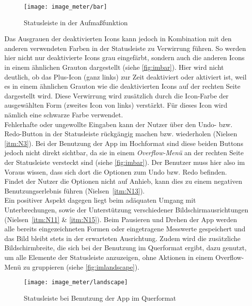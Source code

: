 \begin{wrapfigure}{R}{0.5\textwidth}
  \centering
  \texttt{[image: image\_meter/bar]}
  \caption{Statusleiste in der Aufmaßfunktion}
  \label{fig:imbar}
\end{wrapfigure}

Das Ausgrauen der deaktivierten Icons kann jedoch in Kombination mit den anderen verwendeten Farben in der Statusleiste zu Verwirrung führen.
So werden hier nicht nur deaktivierte Icons grau eingefärbt, sondern auch die anderen Icons in einem ähnlichen Grauton dargestellt (siehe \autoref{fig:imbar}).
Hier wird nicht deutlich, ob das Plus-Icon (ganz links) zur Zeit deaktiviert oder aktiviert ist, weil es in einem ähnlichen Grauton wie die deaktivierten Icons auf der rechten Seite dargestellt wird.
Diese Verwirrung wird zusätzlich durch die Icon-Farbe der ausgewählten Form (zweites Icon von links) verstärkt.
Für dieses Icon wird nämlich eine schwarze Farbe verwendet. \\

Fehlerhafte oder ungewollte Eingaben kann der Nutzer über den Undo- bzw. Redo-Button in der Statusleiste rückgängig machen bzw. wiederholen (Nielsen \autoref{itm:N3}).
Bei der Benutzung der App im Hochformat sind diese beiden Buttons jedoch nicht direkt sichtbar, da sie in einem \emph{Overflow-Menü} an der rechten Seite der Statusleiste versteckt sind (siehe \autoref{fig:imbar}).
Der Benutzer muss hier also im Voraus wissen, dass sich dort die Optionen zum Undo bzw. Redo befinden.
Findet der Nutzer die Optionen nicht auf Anhieb, kann dies zu einem negativen Benutzungserlebnis führen (Nielsen~\autoref{itm:N13}). \\

Ein positiver Aspekt dagegen liegt beim adäquaten Umgang mit Unterbrechungen, sowie der Unterstützung verschiedener Bildschirmausrichtungen (Nielsen~\autoref{itm:N11} \& \autoref{itm:N15}).
Beim Pausieren und Drehen der App werden alle bereits eingezeichneten Formen oder eingetragene Messwerte gespeichert und das Bild bleibt stets in der erwarteten Ausrichtung.
Zudem wird die zusätzliche Bildschirmbreite, die sich bei der Benutzung im Querformat ergibt, dazu genutzt, um alle Elemente der Statusleiste anzuzeigen, ohne Aktionen in einem Overflow-Menü zu gruppieren (siehe \autoref{fig:imlandscape}).

\begin{figure}[h]
  \centering
  \texttt{[image: image\_meter/landscape]}
  \caption{Statusleiste bei Benutzung der App im Querformat}
  \label{fig:imlandscape}
\end{figure}

